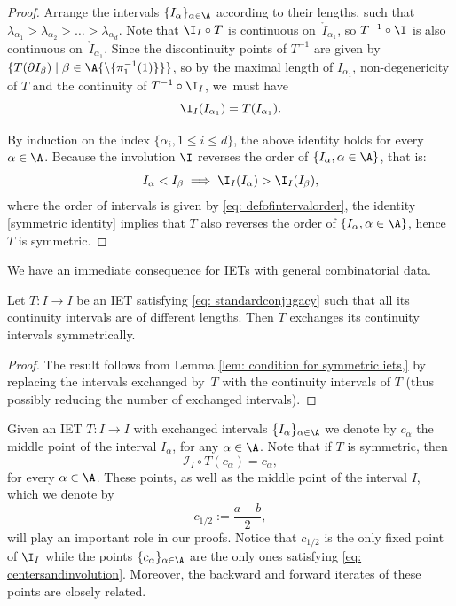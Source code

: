 \begin{proof}
Arrange the intervals $\{I_{\alpha}\}_{\alpha\in \A}$ according to their lengths, such that $\lambda_{\alpha_1}>\lambda_{\alpha_2}>\dots> \lambda_{\alpha_d}$.
Note that $\I_I\circ T$ is continuous on~$\mathring I_{\alpha_1}$, so $T^{-1}\circ \I$ is also continuous on~$\mathring I_{\alpha_1}$. Since the discontinuity points of $T^{-1}$ are given by $\{T(\partial I_{\beta}) \mid \beta\in \A {\setminus \{\pi_1^{-1}(1)\}}\}$, so by the maximal length of $I_{\alpha_1}$, non-degenericity of $T$ and the continuity of $T^{-1}\circ \I_I$, we~must have
\begin{equation}\label{symmetric identity}
\I_I(I_{\alpha_1})=T(I_{\alpha_1}).
\end{equation}

By induction on the index $\{\alpha_i, 1\le i\le d\}$, the above identity holds for every $\alpha \in \A$. Because the involution $\I$ reverses the order of $\{I_{\alpha}, \alpha \in \A\}$, that is:
\[
I_{\alpha}<I_{\beta}\implies \I_I(I_{\alpha})>\I_I(I_{\beta}),
\]
{where the order of intervals is given by \eqref{eq: defofintervalorder}, }the identity \eqref{symmetric identity} implies that $T$ also reverses the order of $\{I_{\alpha}, \alpha \in \A\}$, hence $T$ is symmetric.
\end{proof}
We have an immediate consequence for IETs with general combinatorial data.
\begin{corollary}\label{cor: symmetricintcont}
Let $T: I \to I$ be an IET satisfying \eqref{eq: standardconjugacy} such that all its continuity intervals are of different lengths. Then $T$ exchanges its continuity intervals symmetrically.
\end{corollary}

\begin{proof}
The result follows from Lemma \ref{lem: condition for symmetric iets,} by replacing the intervals exchanged by~$T$ with the continuity intervals of $T$ (thus possibly reducing the number of exchanged intervals).
\end{proof}

Given an IET $T: I \to I$ with exchanged intervals $\{I_{\alpha}\}_{\alpha \in \A}$ we denote by $c_{\alpha}$ the middle point of the interval $I_\alpha$, for any $\alpha\in\A$. Note that if $T$ is symmetric, then\vspace*{-3pt}
\begin{equation}\label{eq: centersandinvolution}
\mathcal{I}_I\circ T(c_{\alpha})=c_{\alpha},
\end{equation}
for every $\alpha\in\A$. These points, as well as the middle point of the interval $I$, which we denote by\vspace*{-3pt}
\[
c_{1/2} := \frac{a + b}{2},
\]
will play an important role in our proofs. Notice that $c_{1/2}$ is the only fixed point of $\I_I$ while the points $\{c_{\alpha}\}_{\alpha\in\A}$ are the only ones satisfying
\eqref{eq: centersandinvolution}. Moreover, the backward and forward
iterates of these points are closely related.

